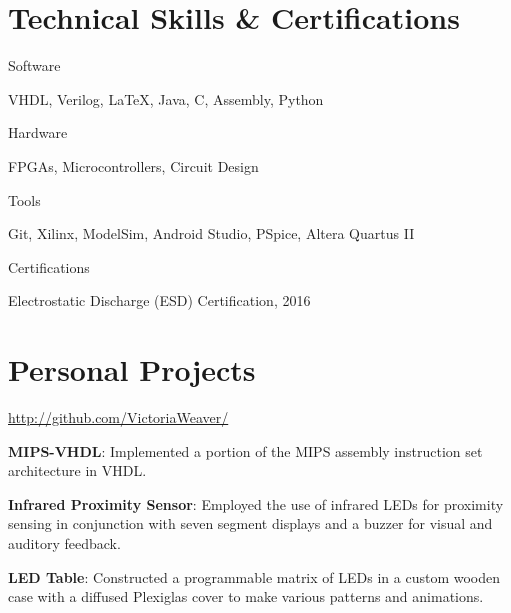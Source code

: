 \documentclass[a4paper,margin,line]{resume}
\begin{document}
\begin{resume}
\section{\mysidestyle Technical Skills \& Certifications}
    \begin{compactdesc}
        \item[Software] \begin{inparaenum} { \small
            VHDL,
            Verilog,
            \LaTeX,
            Java,
            C,
            Assembly,
            Python
        } \end{inparaenum}
        \item[Hardware] \begin{inparaenum} { \small
            FPGAs, Microcontrollers, Circuit Design
       } \end{inparaenum}
        \item[Tools] \begin{inparaenum} { \small
            Git,
            Xilinx,
            ModelSim,
            Android Studio,
            PSpice,
            Altera Quartus II
        } \end{inparaenum}
        \item[Certifications] \begin{inparaenum} { \small
            Electrostatic Discharge (ESD) Certification, 2016   
        } \end{inparaenum}
    \end{compactdesc}

\section{\mysidestyle Personal Projects}
    \begin{asparablank}
        \item \href{http://github.com/VictoriaWeaver/}{http://github.com/VictoriaWeaver/}\\
        \item \textbf{MIPS-VHDL}: Implemented a portion of the MIPS assembly instruction set 
            architecture in VHDL.\\
        \item \textbf{Infrared Proximity Sensor}: Employed the use of infrared LEDs for proximity 
            sensing in conjunction with seven segment displays and a buzzer for visual and auditory 
            feedback.\\
        \item \textbf{LED Table}: Constructed a programmable matrix of LEDs in a custom wooden 
            case with a diffused Plexiglas cover to make various patterns and animations.\\
    \end{asparablank}
    

\end{resume}
\end{document}
